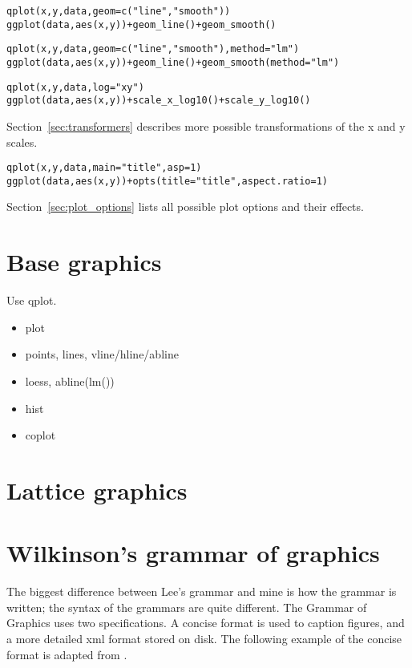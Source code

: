 \begin{alltt}
qplot(x, y, data, geom=c("line", "smooth"))
ggplot(data, aes(x, y)) + geom_line() + geom_smooth()
\end{alltt}

\begin{alltt}
qplot(x, y, data, geom=c("line", "smooth"), method="lm")
ggplot(data, aes(x, y)) + geom_line() + geom_smooth(method="lm")
\end{alltt}


\begin{alltt}
qplot(x, y, data, log="xy")
ggplot(data, aes(x, y)) + scale_x_log10() + scale_y_log10()
\end{alltt}

Section~\ref{sec:transformers} describes more possible transformations of the x and y scales.

\begin{alltt}
qplot(x, y, data, main="title", asp = 1)
ggplot(data, aes(x, y)) + opts(title = "title", aspect.ratio = 1)
\end{alltt}

Section~\ref{sec:plot_options} lists all possible plot options and their effects.


\section{Base graphics}
\label{sec:base_graphics}

Use qplot.

\begin{itemize}
  \item plot
  \item points, lines, vline/hline/abline
  \item loess, abline(lm())
  \item hist
  \item coplot
\end{itemize}

\section{Lattice graphics}
\label{sec:lattice_graphics}

\section{Wilkinson's grammar of graphics}

The biggest difference between Lee's grammar and mine is how the grammar is written; the syntax of the grammars are quite different.  The Grammar of Graphics uses two specifications.  A concise format is used to caption figures, and a more detailed xml format stored on disk.  The following example of the concise format is adapted from \citet[][Figure 1.5, page 13]{wilkinson:2006}.

